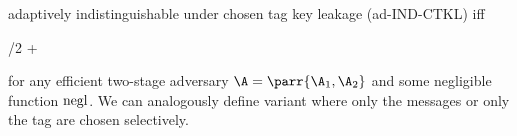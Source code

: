 \begin{definition}
\begin{sitemize}
        \item adaptively indistinguishable under chosen tag key leakage (ad-IND-CTKL) iff
        \begin{bralign}
            /2 + \varepsilon\parr{\secpar}
        \end{bralign}
    \end{sitemize}
    for any efficient two-stage adversary \(\A = \parr{\A_1, \A_2}\) and some negligible function \(\operatorname{negl}\).
    We can analogously define variant where only the messages or only the tag are chosen selectively.
\end{definition}


